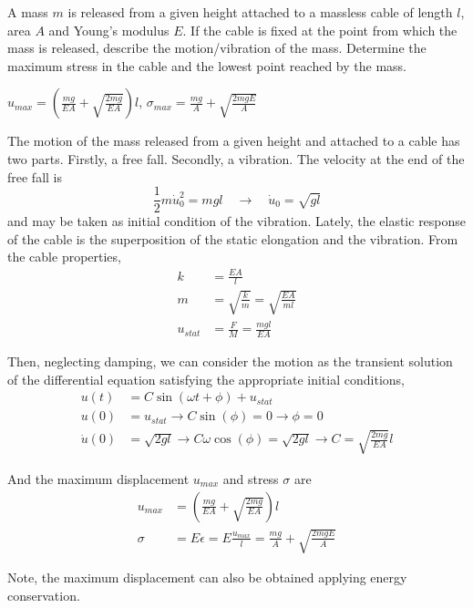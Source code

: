 
\begin{Exercise}[label={mass_released}]
A mass $m$ is released from a given height attached to a massless cable of length $l$, area $A$ and Young's modulus $E$. If the cable is fixed at the point from which the mass is released, describe the motion/vibration of the mass. Determine the maximum stress in the cable and the lowest point reached by the mass.

\begin{center}
\end{center}

\shortAnswer $u_{max} = \left(\frac{mg}{EA} + \sqrt{\frac{2mg}{EA}}\right)l$, $\sigma_{max} = \frac{mg}{A} + \sqrt{\frac{2mgE}{A}}$  
\end{Exercise}



\begin{Answer}[ref={mass_released}]
The motion of the mass released from a given height and attached to a cable has two parts. Firstly, a free fall. Secondly, a vibration. The velocity at the end of the free fall is
$$
\frac{1}{2}m\dot{u}_0^2 = mgl \quad \rightarrow \quad \dot{u}_0 = \sqrt{gl}
$$
and may be taken as initial condition of the vibration. Lately, the elastic response of the cable is the superposition of the static elongation and the vibration. From the cable properties,
\begin{align*}
k &= \frac{EA}{l} \\
m &= \sqrt{\frac{k}{m}} = \sqrt{\frac{EA}{ml}} \\
u_{stat} &= \frac{F}{M} = \frac{mgl}{EA}
\end{align*}

Then, neglecting damping, we can consider the motion as the transient solution of the differential equation satisfying the appropriate initial conditions,
\begin{align*}
u(t) &= C\sin(\omega t + \phi) + u_{stat} \\
u(0) &= u_{stat} \rightarrow C\sin(\phi) = 0 \rightarrow \phi = 0 \\
\dot{u}(0) &= \sqrt{2gl} \rightarrow C\omega\cos(\phi) =  \sqrt{2gl} \rightarrow C = \sqrt{\frac{2mg}{EA}}l
\end{align*}

And the maximum displacement $u_{max}$ and stress $\sigma$ are
\begin{align*}
u_{max} &= \left(\frac{mg}{EA} + \sqrt{\frac{2mg}{EA}}\right)l \\
\sigma &= E\epsilon = E\frac{u_{max}}{l} = \frac{mg}{A} + \sqrt{\frac{2mgE}{A}}
\end{align*}
\end{Answer}

Note, the maximum displacement can also be obtained applying energy conservation.